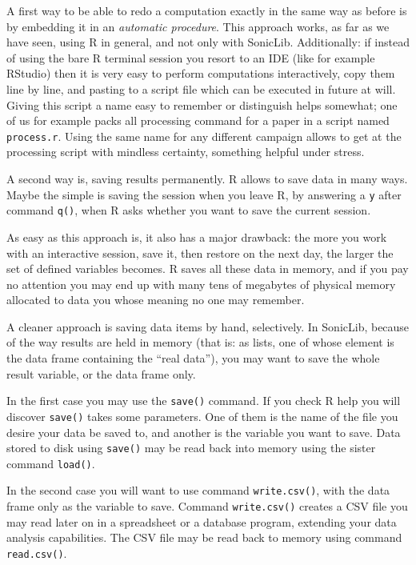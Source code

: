 \documentclass[a4paper,10pt]{book}
\begin{document}
A first way to be able to redo a computation exactly in the same way as before is by embedding it in an \emph{automatic procedure}. This approach works, as far as we have seen, using R in general, and not only with SonicLib. Additionally: if instead of using the bare R terminal session you resort to an IDE (like for example RStudio) then it is very easy to perform computations interactively, copy them line by line, and pasting to a script file which can be executed in future at will. Giving this script a name easy to remember or distinguish helps somewhat; one of us for example packs all processing command for a paper in a script named \verb|process.r|. Using the same name for any different campaign allows to get at the processing script with mindless certainty, something helpful under stress.

A second way is, saving results permanently. R allows to save data in many ways. Maybe the simple is saving the session when you leave R, by answering a \verb|y| after command \verb|q()|, when R asks whether you want to save the current session.

As easy as this approach is, it also has a major drawback: the more you work with an interactive session, save it, then restore on the next day, the larger the set of defined variables becomes. R saves all these data in memory, and if you pay no attention you may end up with many tens of megabytes of physical memory allocated to data you whose meaning no one may remember.

A cleaner approach is saving data items by hand, selectively. In SonicLib, because of the way results are held in memory (that is: as lists, one of whose element is the data frame containing the ``real data''), you may want to save the whole result variable, or the data frame only.

In the first case you may use the \verb|save()| command. If you check R help you will discover \verb|save()| takes some parameters. One of them is the name of the file you desire your data be saved to, and another is the variable you want to save. Data stored to disk using \verb|save()| may be read back into memory using the sister command \verb|load()|.

In the second case you will want to use command \verb|write.csv()|, with the data frame only as the variable to save. Command \verb|write.csv()| creates a CSV file you may read later on in a spreadsheet or a database program, extending your data analysis capabilities. The CSV file may be read back to memory using command \verb|read.csv()|.
\end{document}

